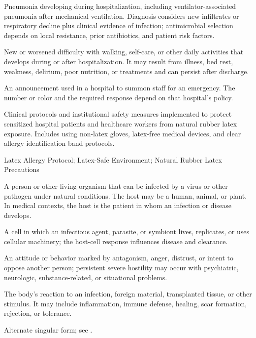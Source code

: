  Pneumonia developing during hospitalization, including ventilator-associated pneumonia after mechanical ventilation. Diagnosis considers new infiltrates or respiratory decline plus clinical evidence of infection; antimicrobial selection depends on local resistance, prior antibiotics, and patient risk factors.

 New or worsened difficulty with walking, self-care, or other daily activities that develops during or after hospitalization. It may result from illness, bed rest, weakness, delirium, poor nutrition, or treatments and can persist after discharge.

 An announcement used in a hospital to summon staff for an emergency. The number or color and the required response depend on that hospital's policy.

 Clinical protocols and institutional safety measures implemented to protect sensitized hospital patients and healthcare workers from natural rubber latex exposure. Includes using non-latex gloves, latex-free medical devices, and clear allergy identification band protocols.

\synonyms
Latex Allergy Protocol; Latex-Safe Environment; Natural Rubber Latex Precautions

 A person or other living organism that can be infected by a virus or other pathogen
under natural conditions. The host may be a human, animal, or plant. In medical
contexts, the host is the patient in whom an infection or disease develops.

 A cell in which an infectious agent, parasite, or symbiont lives, replicates, or uses cellular machinery; the host-cell response influences disease and clearance.

 An attitude or behavior marked by antagonism, anger, distrust, or intent to oppose another person; persistent severe hostility may occur with psychiatric, neurologic, substance-related, or situational problems.

 The body's reaction to an infection, foreign material, transplanted tissue, or other stimulus. It may include inflammation, immune defense, healing, scar formation, rejection, or tolerance.

 Alternate singular form; see .

